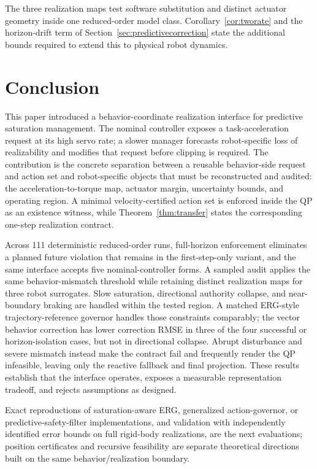 \documentclass[journal]{IEEEtran}
\begin{document}
The three realization maps test software substitution and distinct actuator geometry inside one reduced-order model class. Corollary~\ref{cor:tworate} and the horizon-drift term of Section~\ref{sec:predictivecorrection} state the additional bounds required to extend this to physical robot dynamics.

\section{Conclusion}

This paper introduced a behavior-coordinate realization interface for predictive saturation management. The nominal controller exposes a task-acceleration request at its high servo rate; a slower manager forecasts robot-specific loss of realizability and modifies that request before clipping is required. The contribution is the concrete separation between a reusable behavior-side request and action set and robot-specific objects that must be reconstructed and audited: the acceleration-to-torque map, actuator margin, uncertainty bounds, and operating region. A minimal velocity-certified action set is enforced inside the QP as an existence witness, while Theorem~\ref{thm:transfer} states the corresponding one-step realization contract.

Across 111 deterministic reduced-order runs, full-horizon enforcement eliminates a planned future violation that remains in the first-step-only variant, and the same interface accepts five nominal-controller forms. A sampled audit applies the same behavior-mismatch threshold while retaining distinct realization maps for three robot surrogates. Slow saturation, directional authority collapse, and near-boundary braking are handled within the tested region. A matched ERG-style trajectory-reference governor handles those constraints comparably; the vector behavior correction has lower correction RMSE in three of the four successful or horizon-isolation cases, but not in directional collapse. Abrupt disturbance and severe mismatch instead make the contract fail and frequently render the QP infeasible, leaving only the reactive fallback and final projection. These results establish that the interface operates, exposes a measurable representation tradeoff, and rejects assumptions as designed.

Exact reproductions of saturation-aware ERG, generalized action-governor,
or predictive-safety-filter implementations, and validation with independently identified error bounds on full
rigid-body realizations, are the next evaluations; position certificates and recursive feasibility are separate theoretical directions built on the same behavior/realization boundary.
\end{document}
